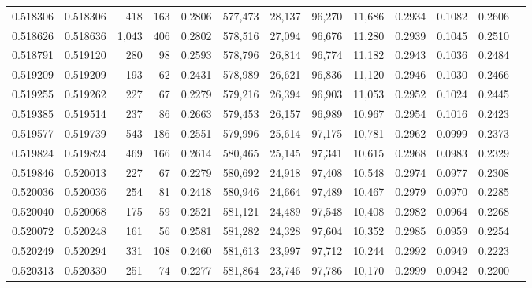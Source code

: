 \begin{tabular}{rrrrrrrrrrrrr}
0.518306 & 0.518306 &   418 &   163 &                                     0.2806 & 577,473 &  28,137 &  96,270 &  11,686 & 0.2934 & 0.1082 & 0.2606 \\
0.518626 & 0.518636 & 1,043 &   406 &                                     0.2802 & 578,516 &  27,094 &  96,676 &  11,280 & 0.2939 & 0.1045 & 0.2510 \\
0.518791 & 0.519120 &   280 &    98 &                                     0.2593 & 578,796 &  26,814 &  96,774 &  11,182 & 0.2943 & 0.1036 & 0.2484 \\
0.519209 & 0.519209 &   193 &    62 &                                     0.2431 & 578,989 &  26,621 &  96,836 &  11,120 & 0.2946 & 0.1030 & 0.2466 \\
0.519255 & 0.519262 &   227 &    67 &                                     0.2279 & 579,216 &  26,394 &  96,903 &  11,053 & 0.2952 & 0.1024 & 0.2445 \\
0.519385 & 0.519514 &   237 &    86 &                                     0.2663 & 579,453 &  26,157 &  96,989 &  10,967 & 0.2954 & 0.1016 & 0.2423 \\
0.519577 & 0.519739 &   543 &   186 &                                     0.2551 & 579,996 &  25,614 &  97,175 &  10,781 & 0.2962 & 0.0999 & 0.2373 \\
0.519824 & 0.519824 &   469 &   166 &                                     0.2614 & 580,465 &  25,145 &  97,341 &  10,615 & 0.2968 & 0.0983 & 0.2329 \\
0.519846 & 0.520013 &   227 &    67 &                                     0.2279 & 580,692 &  24,918 &  97,408 &  10,548 & 0.2974 & 0.0977 & 0.2308 \\
0.520036 & 0.520036 &   254 &    81 &                                     0.2418 & 580,946 &  24,664 &  97,489 &  10,467 & 0.2979 & 0.0970 & 0.2285 \\
0.520040 & 0.520068 &   175 &    59 &                                     0.2521 & 581,121 &  24,489 &  97,548 &  10,408 & 0.2982 & 0.0964 & 0.2268 \\
0.520072 & 0.520248 &   161 &    56 &                                     0.2581 & 581,282 &  24,328 &  97,604 &  10,352 & 0.2985 & 0.0959 & 0.2254 \\
0.520249 & 0.520294 &   331 &   108 &                                     0.2460 & 581,613 &  23,997 &  97,712 &  10,244 & 0.2992 & 0.0949 & 0.2223 \\
0.520313 & 0.520330 &   251 &    74 &                                     0.2277 & 581,864 &  23,746 &  97,786 &  10,170 & 0.2999 & 0.0942 & 0.2200 \\

\end{tabular}

